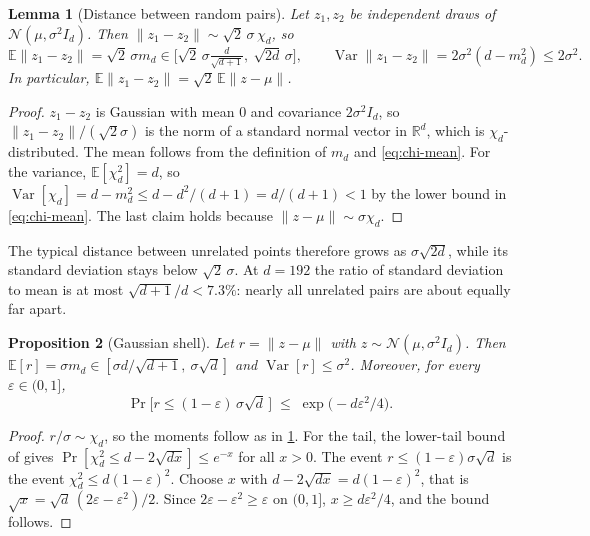 \documentclass{article} %
\newtheorem{lemma}{Lemma}
\newtheorem{proposition}[lemma]{Proposition}
\begin{document}
\begin{lemma}[Distance between random pairs]
\label{lem:random-pair}
Let $z_1,z_2$ be independent draws of $\mathcal N(\mu,\sigma^2 I_d)$. Then
$\|z_1-z_2\|\sim\sqrt2\,\sigma\,\chi_d$, so
\[
  \mathbb E\|z_1-z_2\|=\sqrt2\,\sigma m_d\in\Big[\sqrt2\,\sigma\tfrac{d}{\sqrt{d+1}},\ \sqrt{2d}\,\sigma\Big],
  \qquad
  \operatorname{Var}\|z_1-z_2\|=2\sigma^2(d-m_d^2)\le 2\sigma^2 .
\]
In particular, $\mathbb E\|z_1-z_2\|=\sqrt2\,\mathbb E\|z-\mu\|$.
\end{lemma}
\begin{proof}
$z_1-z_2$ is Gaussian with mean $0$ and covariance $2\sigma^2 I_d$, so $\|z_1-z_2\|/(\sqrt2\sigma)$
is the norm of a standard normal vector in $\mathbb R^d$, which is $\chi_d$-distributed. The
mean follows from the definition of $m_d$ and \cref{eq:chi-mean}. For the variance,
$\mathbb E[\chi_d^2]=d$, so $\operatorname{Var}[\chi_d]=d-m_d^2\le d-d^2/(d+1)=d/(d+1)<1$ by the
lower bound in \cref{eq:chi-mean}. The last claim holds because $\|z-\mu\|\sim\sigma\chi_d$.
\end{proof}

The typical distance between unrelated points therefore grows as $\sigma\sqrt{2d}$, while its
standard deviation stays below $\sqrt2\,\sigma$. At $d=192$ the ratio of standard deviation to mean is at most $\sqrt{d+1}/d<7.3\%$:
nearly all unrelated pairs are about equally far apart.

\begin{proposition}[Gaussian shell]
\label{prop:shell}
Let $r=\|z-\mu\|$ with $z\sim\mathcal N(\mu,\sigma^2 I_d)$. Then
$\mathbb E[r]=\sigma m_d\in[\sigma d/\sqrt{d+1},\ \sigma\sqrt d]$ and
$\operatorname{Var}[r]\le\sigma^2$. Moreover, for every $\varepsilon\in(0,1]$,
\[
  \Pr\big[r\le(1-\varepsilon)\,\sigma\sqrt d\,\big]\;\le\;\exp\!\big(-d\varepsilon^2/4\big).
\]
\end{proposition}
\begin{proof}
$r/\sigma\sim\chi_d$, so the moments follow as in \cref{lem:random-pair}. For the tail, the
lower-tail bound of \citet{laurent2000adaptive} gives
$\Pr[\chi_d^2\le d-2\sqrt{dx}]\le e^{-x}$ for all $x>0$. The event
$r\le(1-\varepsilon)\sigma\sqrt d$ is the event $\chi_d^2\le d(1-\varepsilon)^2$. Choose $x$
with $d-2\sqrt{dx}=d(1-\varepsilon)^2$, that is $\sqrt x=\sqrt d\,(2\varepsilon-\varepsilon^2)/2$.
Since $2\varepsilon-\varepsilon^2\ge\varepsilon$ on $(0,1]$, $x\ge d\varepsilon^2/4$, and the bound
follows.
\end{proof}
\end{document}
